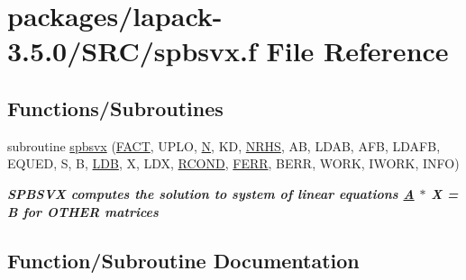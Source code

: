 \hypertarget{spbsvx_8f}{}\section{packages/lapack-\/3.5.0/\+S\+R\+C/spbsvx.f File Reference}
\label{spbsvx_8f}
\subsection*{Functions/\+Subroutines}
\begin{DoxyCompactItemize}
\item 
subroutine \hyperlink{spbsvx_8f_a173d044dadcc86da5e6f9e5c3dcee071}{spbsvx} (\hyperlink{superlu__enum__consts_8h_af00a42ecad444bbda75cde1b64bd7e72a1b6692b56d378abb85bd49063721d034}{F\+A\+C\+T}, U\+P\+L\+O, \hyperlink{polmisc_8c_a0240ac851181b84ac374872dc5434ee4}{N}, K\+D, \hyperlink{example__user_8c_aa0138da002ce2a90360df2f521eb3198}{N\+R\+H\+S}, A\+B, L\+D\+A\+B, A\+F\+B, L\+D\+A\+F\+B, E\+Q\+U\+E\+D, S, B, \hyperlink{example__user_8c_a50e90a7104df172b5a89a06c47fcca04}{L\+D\+B}, X, L\+D\+X, \hyperlink{superlu__enum__consts_8h_af00a42ecad444bbda75cde1b64bd7e72a9b5c151728d8512307565994c89919d5}{R\+C\+O\+N\+D}, \hyperlink{superlu__enum__consts_8h_af00a42ecad444bbda75cde1b64bd7e72a78fd14d7abebae04095cfbe02928f153}{F\+E\+R\+R}, B\+E\+R\+R, W\+O\+R\+K, I\+W\+O\+R\+K, I\+N\+F\+O)
\begin{DoxyCompactList}\small\item\em {\bfseries  S\+P\+B\+S\+V\+X computes the solution to system of linear equations \hyperlink{classA}{A} $\ast$ X = B for O\+T\+H\+E\+R matrices} \end{DoxyCompactList}\end{DoxyCompactItemize}


\subsection{Function/\+Subroutine Documentation}
\hypertarget{spbsvx_8f_a173d044dadcc86da5e6f9e5c3dcee071}{}
